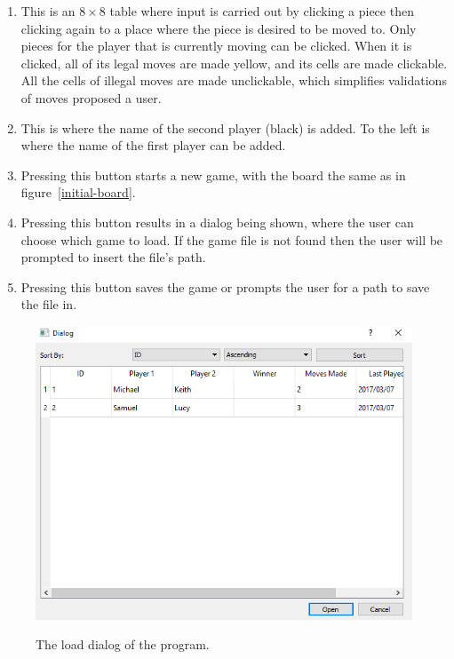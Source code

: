 \begin{enumerate}[label=(\Alph*)]
	\item This is an $ 8\times8 $ table where input is carried out by clicking a piece then clicking again to a place where the piece is desired to be moved to. Only pieces for the player that is currently moving can be clicked. When it is clicked, all of its legal moves are made yellow, and its cells are made clickable. All the cells of illegal moves are made unclickable, which simplifies validations of moves proposed a user.
	\item This is where the name of the second player (black) is added. To the left is where the name of the first player can be added.
	\item Pressing this button starts a new game, with the board the same as in figure~\ref{initial-board}.
	\item Pressing this button results in a dialog being shown, where the user can choose which game to load. If the game file is not found then the user will be prompted to insert the file's path.
	\item Pressing this button saves the game or prompts the user for a path to save the file in.
\end{enumerate}
\begin{figure}[H]
	\centering
	\begin{annotatedFigure}
		{\includegraphics{images/screenshots/load-dialog}}
	\end{annotatedFigure}
	\caption{The load dialog of the program.}
\end{figure}
